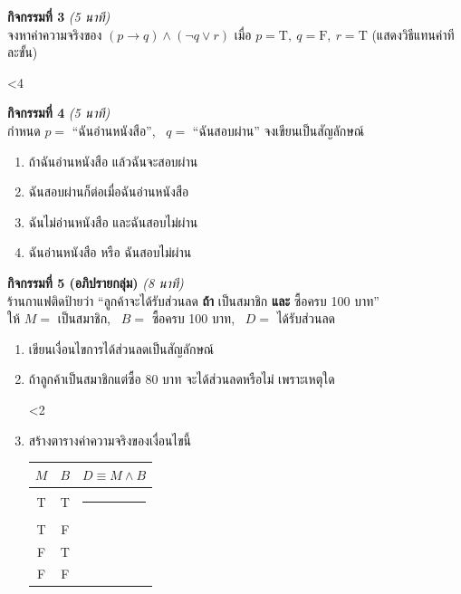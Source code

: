 \documentclass[a4paper,12pt]{article}
\newcounter{bl}
\newcommand{\blank}[1]{\par\vspace{0.2em}%
  \setcounter{bl}{0}\loop\ifnum\value{bl}<#1\relax
  \noindent\textcolor{gray!60}{\hrulefill}\par\vspace{1.0em}\stepcounter{bl}\repeat}
\begin{document}
\noindent\textbf{กิจกรรมที่ 3} \hfill \textit{(5 นาที)}\\
จงหาค่าความจริงของ \quad $(p \rightarrow q) \land (\neg q \lor r)$ \quad เมื่อ $p=\text{T},\ q=\text{F},\ r=\text{T}$
(แสดงวิธีแทนค่าทีละขั้น)
\blank{4}

\noindent\textbf{กิจกรรมที่ 4} \hfill \textit{(5 นาที)}\\
กำหนด $p=$ ``ฉันอ่านหนังสือ'', \ $q=$ ``ฉันสอบผ่าน'' จงเขียนเป็นสัญลักษณ์
\begin{enumerate}[label=\arabic*)]
  \item ถ้าฉันอ่านหนังสือ แล้วฉันจะสอบผ่าน \hfill \dotfill
  \item ฉันสอบผ่านก็ต่อเมื่อฉันอ่านหนังสือ \hfill \dotfill
  \item ฉันไม่อ่านหนังสือ และฉันสอบไม่ผ่าน \hfill \dotfill
  \item ฉันอ่านหนังสือ หรือ ฉันสอบไม่ผ่าน \hfill \dotfill
\end{enumerate}
\vspace{0.4em}

\noindent\textbf{กิจกรรมที่ 5 (อภิปรายกลุ่ม)} \hfill \textit{(8 นาที)}\\
ร้านกาแฟติดป้ายว่า ``ลูกค้าจะได้รับส่วนลด \textbf{ถ้า} เป็นสมาชิก \textbf{และ} ซื้อครบ 100 บาท''\\
ให้ $M=$ เป็นสมาชิก, \ $B=$ ซื้อครบ 100 บาท, \ $D=$ ได้รับส่วนลด
\begin{enumerate}[label=\arabic*)]
  \item เขียนเงื่อนไขการได้ส่วนลดเป็นสัญลักษณ์ \hfill \dotfill
  \item ถ้าลูกค้าเป็นสมาชิกแต่ซื้อ 80 บาท จะได้ส่วนลดหรือไม่ เพราะเหตุใด
  \blank{2}
  \item สร้างตารางค่าความจริงของเงื่อนไขนี้
\begin{center}
\begin{tabular}{|c|c|c|}
  \hline
  \textbf{$M$} & \textbf{$B$} & \textbf{$D \equiv M \land B$} \\ \hline
  T & T & \rule{3cm}{0pt} \\ \hline
  T & F &  \\ \hline
  F & T &  \\ \hline
  F & F &  \\ \hline
\end{tabular}
\end{center}
\end{enumerate}
\end{document}
